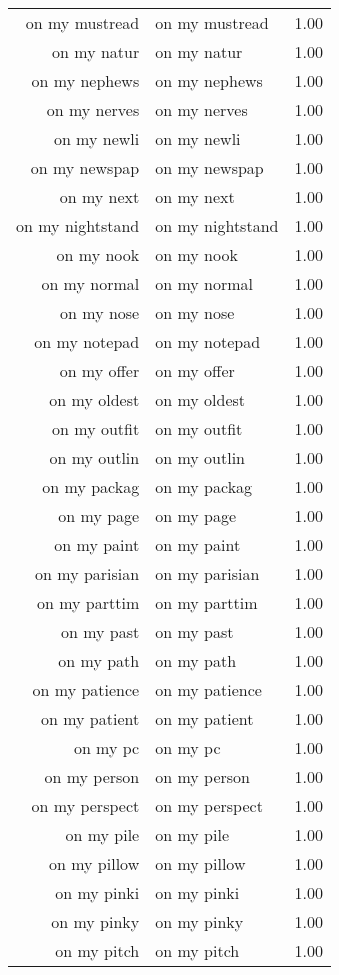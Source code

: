 \begin{table}[ht]
\begin{tabular}{rlr}
  on my mustread & on my mustread & 1.00 \\ 
  on my natur & on my natur & 1.00 \\ 
  on my nephews & on my nephews & 1.00 \\ 
  on my nerves & on my nerves & 1.00 \\ 
  on my newli & on my newli & 1.00 \\ 
  on my newspap & on my newspap & 1.00 \\ 
  on my next & on my next & 1.00 \\ 
  on my nightstand & on my nightstand & 1.00 \\ 
  on my nook & on my nook & 1.00 \\ 
  on my normal & on my normal & 1.00 \\ 
  on my nose & on my nose & 1.00 \\ 
  on my notepad & on my notepad & 1.00 \\ 
  on my offer & on my offer & 1.00 \\ 
  on my oldest & on my oldest & 1.00 \\ 
  on my outfit & on my outfit & 1.00 \\ 
  on my outlin & on my outlin & 1.00 \\ 
  on my packag & on my packag & 1.00 \\ 
  on my page & on my page & 1.00 \\ 
  on my paint & on my paint & 1.00 \\ 
  on my parisian & on my parisian & 1.00 \\ 
  on my parttim & on my parttim & 1.00 \\ 
  on my past & on my past & 1.00 \\ 
  on my path & on my path & 1.00 \\ 
  on my patience & on my patience & 1.00 \\ 
  on my patient & on my patient & 1.00 \\ 
  on my pc & on my pc & 1.00 \\ 
  on my person & on my person & 1.00 \\ 
  on my perspect & on my perspect & 1.00 \\ 
  on my pile & on my pile & 1.00 \\ 
  on my pillow & on my pillow & 1.00 \\ 
  on my pinki & on my pinki & 1.00 \\ 
  on my pinky & on my pinky & 1.00 \\ 
  on my pitch & on my pitch & 1.00 \\ 

\end{tabular}
\end{table}

